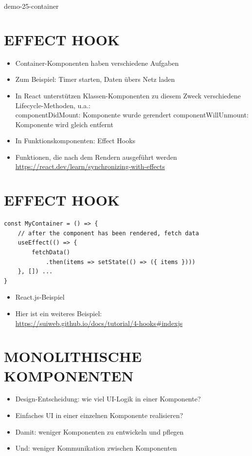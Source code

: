 \documentclass[10pt]{article}
\begin{document}
demo-25-container

\section*{EFFECT HOOK}
\begin{itemize}
  \item Container-Komponenten haben verschiedene Aufgaben
  \item Zum Beispiel: Timer starten, Daten übers Netz laden
  \item In React unterstützen Klassen-Komponenten zu diesem Zweck verschiedene Lifecycle-Methoden, u.a.:\\
componentDidMount: Komponente wurde gerendert componentWillUnmount: Komponente wird gleich entfernt
  \item In Funktionskomponenten: Effect Hooks
  \item Funktionen, die nach dem Rendern ausgeführt werden\\
\href{https://react.dev/learn/synchronizing-with-effects}{https://react.dev/learn/synchronizing-with-effects}
\end{itemize}

\section*{EFFECT HOOK}
\begin{verbatim}
const MyContainer = () => {
    // after the component has been rendered, fetch data
    useEffect(() => {
        fetchData()
            .then(items => setState(() => ({ items })))
    }, []) ...
}
\end{verbatim}

\begin{itemize}
  \item React.js-Beispiel
  \item Hier ist ein weiteres Beispiel:\\
\href{https://suiweb.github.io/docs/tutorial/4-hooks#indexjs}{https://suiweb.github.io/docs/tutorial/4-hooks\#indexjs}
\end{itemize}

\section*{MONOLITHISCHE KOMPONENTEN}
\begin{itemize}
  \item Design-Entscheidung: wie viel UI-Logik in einer Komponente?
  \item Einfaches UI in einer einzelnen Komponente realisieren?
  \item Damit: weniger Komponenten zu entwickeln und pflegen
  \item Und: weniger Kommunikation zwischen Komponenten
\end{itemize}
\end{document}
